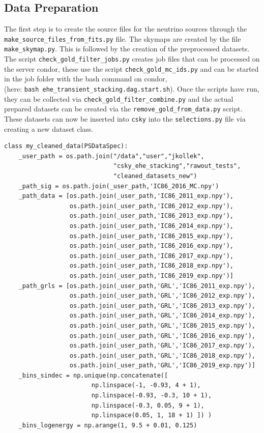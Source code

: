 \subsection{Data Preparation}
The first step is to create the source files for the neutrino sources through the \texttt{make\_source\_files\_from\_fits.py} file.
The skymaps are created by the file \texttt{make\_skymap.py}.
This is followed by the creation of the preprocessed datasets.
The script \texttt{check\_gold\_filter\_jobs.py} creates job files that can be processed on the server condor, these use the script \texttt{check\_gold\_mc\_ids.py} and can be started in the job folder with the bash command on condor,\\ (here: \texttt{bash ehe\_transient\_stacking.dag.start.sh}).
Once the scripts have run, they can be collected via \texttt{check\_gold\_filter\_combine.py} and the actual prepared datasets can be created via the \texttt{remove\_gold\_from\_data.py} script.
These datasets can now be inserted into \texttt{csky} into the \texttt{selections.py} file via creating a new dataset class.

\begin{verbatim}
class my_cleaned_data(PSDataSpec):
    _user_path = os.path.join("/data","user","jkollek",
                              "csky_ehe_stacking","rawout_tests",
                              "cleaned_datasets_new")
    _path_sig = os.path.join(_user_path,'IC86_2016_MC.npy')
    _path_data = [os.path.join(_user_path,'IC86_2011_exp.npy'),
                  os.path.join(_user_path,'IC86_2012_exp.npy'),
                  os.path.join(_user_path,'IC86_2013_exp.npy'),
                  os.path.join(_user_path,'IC86_2014_exp.npy'),
                  os.path.join(_user_path,'IC86_2015_exp.npy'),
                  os.path.join(_user_path,'IC86_2016_exp.npy'),
                  os.path.join(_user_path,'IC86_2017_exp.npy'),
                  os.path.join(_user_path,'IC86_2018_exp.npy'),
                  os.path.join(_user_path,'IC86_2019_exp.npy')]
    _path_grls = [os.path.join(_user_path,'GRL','IC86_2011_exp.npy'),
                  os.path.join(_user_path,'GRL','IC86_2012_exp.npy'),
                  os.path.join(_user_path,'GRL','IC86_2013_exp.npy'),
                  os.path.join(_user_path,'GRL','IC86_2014_exp.npy'),
                  os.path.join(_user_path,'GRL','IC86_2015_exp.npy'),
                  os.path.join(_user_path,'GRL','IC86_2016_exp.npy'),
                  os.path.join(_user_path,'GRL','IC86_2017_exp.npy'),
                  os.path.join(_user_path,'GRL','IC86_2018_exp.npy'),
                  os.path.join(_user_path,'GRL','IC86_2019_exp.npy')]
    _bins_sindec = np.unique(np.concatenate([
                        np.linspace(-1, -0.93, 4 + 1),
                        np.linspace(-0.93, -0.3, 10 + 1),
                        np.linspace(-0.3, 0.05, 9 + 1),
                        np.linspace(0.05, 1, 18 + 1) ]) )
    _bins_logenergy = np.arange(1, 9.5 + 0.01, 0.125)
\end{verbatim}

